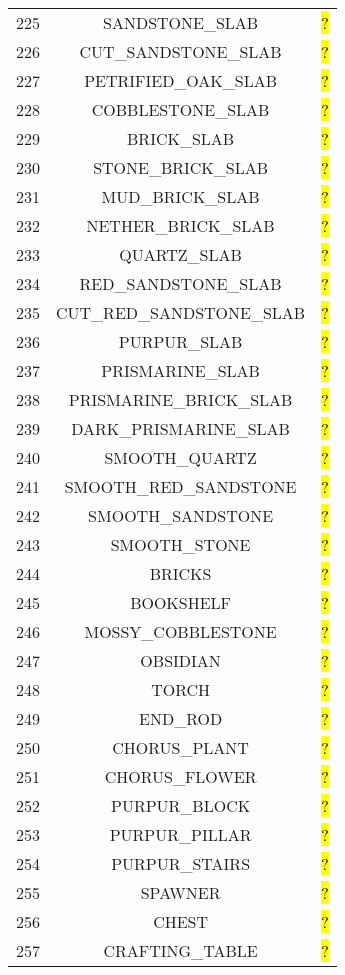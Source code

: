 \documentclass[11pt]{article}
\newcommand\myworries[1]{\sethlcolor{red}\hl{#1}}
\begin{document}
\begin{longtable}{ |c|c|c| }
225 & SANDSTONE\_SLAB & \myworries{?} \\
226 & CUT\_SANDSTONE\_SLAB & \myworries{?} \\
227 & PETRIFIED\_OAK\_SLAB & \myworries{?} \\
228 & COBBLESTONE\_SLAB & \myworries{?} \\
229 & BRICK\_SLAB & \myworries{?} \\
230 & STONE\_BRICK\_SLAB & \myworries{?} \\
231 & MUD\_BRICK\_SLAB & \myworries{?} \\
232 & NETHER\_BRICK\_SLAB & \myworries{?} \\
233 & QUARTZ\_SLAB & \myworries{?} \\
234 & RED\_SANDSTONE\_SLAB & \myworries{?} \\
235 & CUT\_RED\_SANDSTONE\_SLAB & \myworries{?} \\
236 & PURPUR\_SLAB & \myworries{?} \\
237 & PRISMARINE\_SLAB & \myworries{?} \\
238 & PRISMARINE\_BRICK\_SLAB & \myworries{?} \\
239 & DARK\_PRISMARINE\_SLAB & \myworries{?} \\
240 & SMOOTH\_QUARTZ & \myworries{?} \\
241 & SMOOTH\_RED\_SANDSTONE & \myworries{?} \\
242 & SMOOTH\_SANDSTONE & \myworries{?} \\
243 & SMOOTH\_STONE & \myworries{?} \\
244 & BRICKS & \myworries{?} \\
245 & BOOKSHELF & \myworries{?} \\
246 & MOSSY\_COBBLESTONE & \myworries{?} \\
247 & OBSIDIAN & \myworries{?} \\
248 & TORCH & \myworries{?} \\
249 & END\_ROD & \myworries{?} \\
250 & CHORUS\_PLANT & \myworries{?} \\
251 & CHORUS\_FLOWER & \myworries{?} \\
252 & PURPUR\_BLOCK & \myworries{?} \\
253 & PURPUR\_PILLAR & \myworries{?} \\
254 & PURPUR\_STAIRS & \myworries{?} \\
255 & SPAWNER & \myworries{?} \\
256 & CHEST & \myworries{?} \\
257 & CRAFTING\_TABLE & \myworries{?} \\

\end{longtable}
\end{document}
